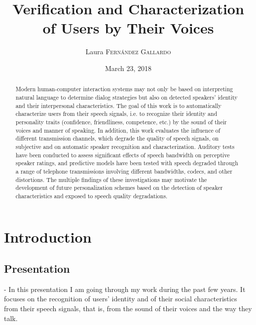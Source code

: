\documentclass[a4paper]{article}
\title{Verification and Characterization of Users by Their Voices} %
\author{Laura \textsc{Fern\'{a}ndez Gallardo}} %
\date{March 23, 2018} %
\begin{document}
\maketitle %

\begin{abstract}
	
Modern human-computer interaction systems may not only be based on interpreting natural language to determine dialog strategies but also on detected speakers' identity and their interpersonal characteristics. The goal of this work is to automatically characterize users from their speech signals, i.e. to recognize their identity and personality traits (confidence, friendliness, competence, etc.) by the sound of their voices and manner of speaking. In addition, this work evaluates the influence of different transmission channels, which degrade the quality of speech signals, on subjective and on automatic speaker recognition and characterization. Auditory tests have been conducted to assess significant effects of speech bandwidth on perceptive speaker ratings, and predictive models have been tested with speech degraded through a range of telephone transmissions involving different bandwidths, codecs, and other distortions. The multiple findings of these investigations may motivate the development of future personalization schemes based on the detection of speaker characteristics and exposed to speech quality degradations.


\end{abstract}



\section{Introduction}

\subsection{Presentation}

- In this presentation I am going through my work during the past few years. It focuses on the recognition of users' identity and of their social characteristics from their speech signals, that is, from the sound of their voices and the way they talk.
\end{document}

